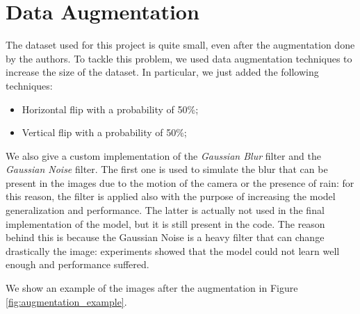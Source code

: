 \section{Data Augmentation}
The dataset used for this project is quite small, even after the augmentation done by the authors. To tackle this problem, we used data augmentation techniques to increase the size of the dataset.
In particular, we just added the following techniques:
\begin{itemize}
    \item Horizontal flip with a probability of 50\%;
    \item Vertical flip with a probability of 50\%;
\end{itemize}

We also give a custom implementation of the \textit{Gaussian Blur} filter and the \textit{Gaussian Noise} filter. The first one is used to simulate the blur that can be present in the images due to the motion of the camera or the presence of rain: for this reason, the filter is applied also with the purpose of increasing the model generalization and performance. 
The latter is actually not used in the final implementation of the model, but it is still present in the code. The reason behind this is because the Gaussian Noise is a heavy filter that can change drastically the image: experiments showed that the model could not learn well enough and performance suffered.

We show an example of the images after the augmentation in Figure \ref{fig:augmentation_example}.

